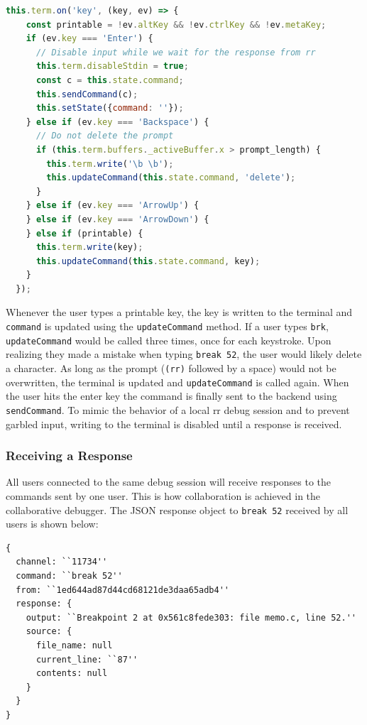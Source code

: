 \documentclass[12pt]{article}
\begin{document}
\begin{lstlisting}[language=Javascript,basicstyle=\linespread{0.5}\ttfamily,caption={Handling Keystrokes},captionpos=b]
  this.term.on('key', (key, ev) => {
    const printable = !ev.altKey && !ev.ctrlKey && !ev.metaKey;
    if (ev.key === 'Enter') {
      // Disable input while we wait for the response from rr
      this.term.disableStdin = true;
      const c = this.state.command;
      this.sendCommand(c);
      this.setState({command: ''});
    } else if (ev.key === 'Backspace') {
      // Do not delete the prompt
      if (this.term.buffers._activeBuffer.x > prompt_length) {
        this.term.write('\b \b');
        this.updateCommand(this.state.command, 'delete');
      }
    } else if (ev.key === 'ArrowUp') {
    } else if (ev.key === 'ArrowDown') {
    } else if (printable) {
      this.term.write(key);
      this.updateCommand(this.state.command, key);
    }
  });
\end{lstlisting}

Whenever the user types a printable key, the key is written to the
terminal and \lstinline{command} is updated using the
\lstinline{updateCommand} method.  If a user types \lstinline{brk},
\lstinline{updateCommand} would be called three times, once for each
keystroke.  Upon realizing they made a mistake when typing
\lstinline{break 52}, the user would likely delete a character.  As
long as the prompt (\lstinline{(rr)} followed by a space) would not be
overwritten, the terminal is updated and \lstinline{updateCommand} is
called again.  When the user hits the enter key the command is finally
sent to the backend using \lstinline{sendCommand}.  To mimic the
behavior of a local rr debug session and to prevent garbled input,
writing to the terminal is disabled until a response is received.

\subsubsection{Receiving a Response}

All users connected to the same debug session will receive responses
to the commands sent by one user.  This is how collaboration is
achieved in the collaborative debugger.  The JSON response object to
\lstinline{break 52} received by all users is shown below:

\begin{lstlisting}[basicstyle=\linespread{0.5}\ttfamily,caption={JSON Response},captionpos=b]
{
  channel: ``11734''
  command: ``break 52''
  from: ``1ed644ad87d44cd68121de3daa65adb4''
  response: {
    output: ``Breakpoint 2 at 0x561c8fede303: file memo.c, line 52.''
    source: {
      file_name: null
      current_line: ``87''
      contents: null
    }
  }
}
\end{lstlisting}
\end{document}
